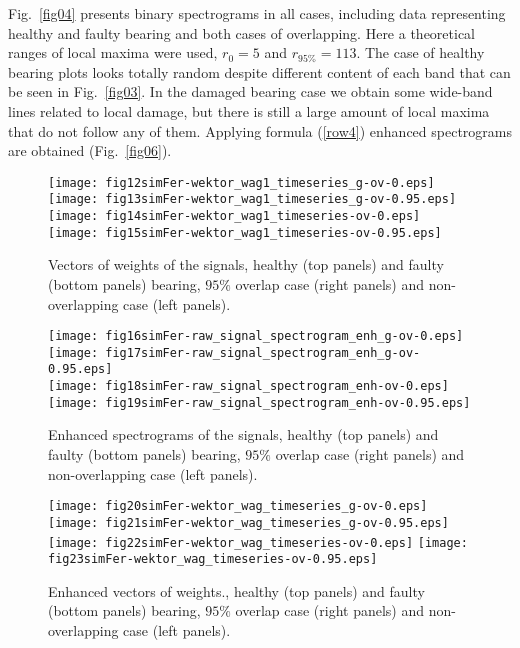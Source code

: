 \documentclass[3p,times]{elsarticle}
\begin{document}
Fig.~\ref{fig04} presents binary spectrograms in all cases, including data representing healthy and faulty bearing and both cases of overlapping. Here a theoretical ranges of local maxima were used, $r_0 =5$ and $r_{95\%} =113$. The case of healthy bearing plots looks totally random despite different content of each band that can be seen in Fig.~\ref{fig03}. In the damaged bearing case we obtain some wide-band lines related to local damage, but there is still a large amount of local maxima that do not follow any of them.
Applying formula (\ref{row4}) enhanced spectrograms are obtained (Fig.~\ref{fig06}).\\
\begin{figure}[!ht]
\begin{center}
\texttt{[image: fig12simFer-wektor\_wag1\_timeseries\_g-ov-0.eps]}\texttt{[image: fig13simFer-wektor\_wag1\_timeseries\_g-ov-0.95.eps]}\\
\texttt{[image: fig14simFer-wektor\_wag1\_timeseries-ov-0.eps]}
\texttt{[image: fig15simFer-wektor\_wag1\_timeseries-ov-0.95.eps]}
\caption{Vectors of weights of the signals, healthy (top panels) and faulty (bottom panels) bearing, $95\%$ overlap case (right panels) and non-overlapping case (left panels).}\label{fig05}
\texttt{[image: fig16simFer-raw\_signal\_spectrogram\_enh\_g-ov-0.eps]}
\texttt{[image: fig17simFer-raw\_signal\_spectrogram\_enh\_g-ov-0.95.eps]}\\
\texttt{[image: fig18simFer-raw\_signal\_spectrogram\_enh-ov-0.eps]}
\texttt{[image: fig19simFer-raw\_signal\_spectrogram\_enh-ov-0.95.eps]}
\caption{Enhanced spectrograms of the signals, healthy (top panels) and faulty (bottom panels) bearing, $95\%$ overlap case (right panels) and non-overlapping case (left panels).}\label{fig06}
\texttt{[image: fig20simFer-wektor\_wag\_timeseries\_g-ov-0.eps]}
\texttt{[image: fig21simFer-wektor\_wag\_timeseries\_g-ov-0.95.eps]}\\
\texttt{[image: fig22simFer-wektor\_wag\_timeseries-ov-0.eps]}
\texttt{[image: fig23simFer-wektor\_wag\_timeseries-ov-0.95.eps]}
\caption{Enhanced vectors of weights., healthy (top panels) and faulty (bottom panels) bearing, $95\%$ overlap case (right panels) and non-overlapping case (left panels).}\label{fig07}
\end{center}
\end{figure}
\end{document}

